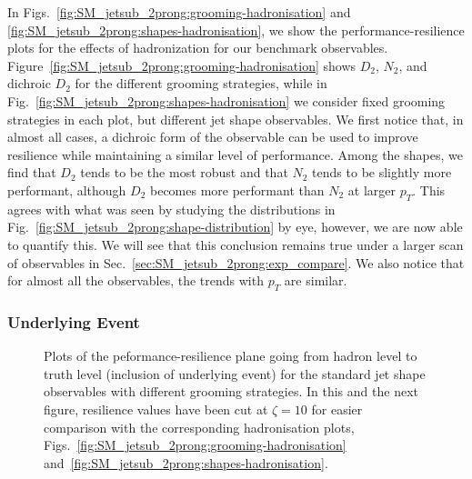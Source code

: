 In Figs.~\ref{fig:SM_jetsub_2prong:grooming-hadronisation} and
\ref{fig:SM_jetsub_2prong:shapes-hadronisation}, we show the
performance-resilience plots for the effects of hadronization for our
benchmark observables.
%
Figure~\ref{fig:SM_jetsub_2prong:grooming-hadronisation} shows $D_2$, $N_2$, and dichroic $D_2$ for the different grooming strategies, while in Fig.~\ref{fig:SM_jetsub_2prong:shapes-hadronisation} we consider fixed grooming strategies in each plot, but different jet shape observables.
%
We first notice that, in almost all cases, a dichroic form of the observable can be used to improve resilience while maintaining a similar level of performance.
%
Among the shapes, we find that $D_2$ tends to be the most robust and
that $N_2$ tends to be slightly more performant, although $D_2$
becomes more performant than $N_2$ at larger $p_T$.
%
This agrees with what was seen by studying the distributions in Fig.~\ref{fig:SM_jetsub_2prong:shape-distribution} by eye, however, we are now able to quantify this.
%
We will see that this conclusion remains true under a larger scan of observables in Sec.~\ref{sec:SM_jetsub_2prong:exp_compare}.
%
We also notice that for almost all the observables, the trends with $p_T$ are similar.




\subsubsection{Underlying Event}\label{sec:SM_jetsub_2prong:UE}


\begin{figure}
  \caption{Plots of the peformance-resilience plane going from hadron
    level to truth level (inclusion of underlying event) for the
    standard jet shape observables with different grooming strategies.
    In this and the next figure, resilience values have been cut at
    $\zeta=10$ for easier comparison with the corresponding
    hadronisation plots,
    Figs.~\ref{fig:SM_jetsub_2prong:grooming-hadronisation}
    and~\ref{fig:SM_jetsub_2prong:shapes-hadronisation}.}\label{fig:SM_jetsub_2prong:grooming-UE}
\end{figure}

